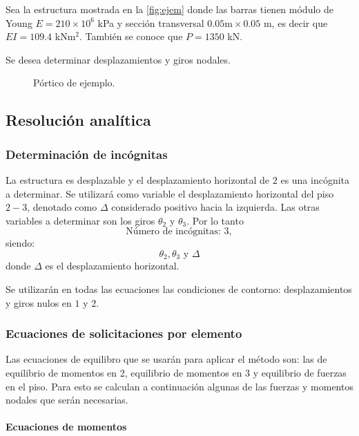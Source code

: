 Sea la estructura mostrada en la \autoref{fig:ejem} donde las barras tienen módulo de Young $E=210 \times 10^{6}$ kPa y sección transversal $0.05 \text{m} \times 0.05$ m, es decir que $EI=109.4 $ kNm$^2$. %
También se conoce que $P = 1350$ kN.



Se desea determinar desplazamientos y giros nodales. %

\begin{figure}[htb]
	\centering
	\def\svgwidth{0.5\textwidth}
	
	\caption{Pórtico de ejemplo.}
	\label{fig:ejem}
\end{figure}

\subsection{Resolución analítica}


\subsubsection{Determinación de incógnitas}
La estructura es desplazable y el desplazamiento horizontal de $2$ es una incógnita a determinar. %
%
Se utilizará como variable el desplazamiento horizontal del piso $2-3$, denotado como $\Delta$ considerado positivo hacia la izquierda. %
%
Las otras variables a determinar son los giros $\theta_2$ y $\theta_3$. %
Por lo tanto 
$$
\boxed{\text{Número de incógnitas: } 3},
$$
siendo:
$$
\boxed{
 \theta_2, \theta_3 \text{ y } \Delta}
$$
donde $\Delta$ es el desplazamiento horizontal.


Se utilizarán en todas las ecuaciones las condiciones de contorno: desplazamientos y giros nulos en $1$ y 2.


\subsubsection{Ecuaciones de solicitaciones por elemento}

Las ecuaciones de equilibro que se usarán para aplicar el método son: las de equilibrio de momentos en 2, equilibrio de momentos en 3 y equilibrio de fuerzas en el piso. Para esto se calculan a continuación algunas de las fuerzas y momentos nodales que serán necesarias.

\paragraph{Ecuaciones de momentos}

